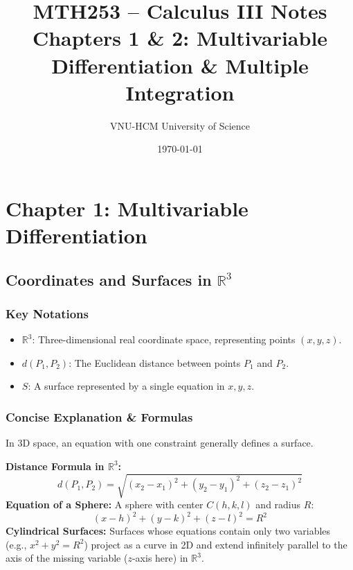 \documentclass[11pt]{article}
\title{\Huge\bfseries\color{primary} MTH253 -- Calculus III Notes \\ \Large Chapters 1 \& 2: Multivariable Differentiation \& Multiple Integration}
\author{\large VNU-HCM University of Science}
\date{\large \today}
\begin{document}
\maketitle

\tableofcontents
\newpage

\section{Chapter 1: Multivariable Differentiation}

\subsection{Coordinates and Surfaces in \texorpdfstring{$\mathbb{R}^3$}{R3}}
\subsubsection*{Key Notations}
\begin{itemize}
    \item $\mathbb{R}^3$: Three-dimensional real coordinate space, representing points $(x,y,z)$.
    \item $d(P_1, P_2)$: The Euclidean distance between points $P_1$ and $P_2$.
    \item $S$: A surface represented by a single equation in $x, y, z$.
\end{itemize}

\subsubsection*{Concise Explanation \& Formulas}
In 3D space, an equation with one constraint generally defines a surface.
\begin{formulabox}
    \textbf{Distance Formula in $\mathbb{R}^3$:}
    \[ d(P_1, P_2) = \sqrt{(x_2-x_1)^2 + (y_2-y_1)^2 + (z_2-z_1)^2} \]
    \textbf{Equation of a Sphere:} A sphere with center $C(h,k,l)$ and radius $R$:
    \[ (x-h)^2 + (y-k)^2 + (z-l)^2 = R^2 \]
    \textbf{Cylindrical Surfaces:} Surfaces whose equations contain only two variables (e.g., $x^2 + y^2 = R^2$) project as a curve in 2D and extend infinitely parallel to the axis of the missing variable ($z$-axis here) in $\mathbb{R}^3$.
\end{formulabox}
\end{document}
